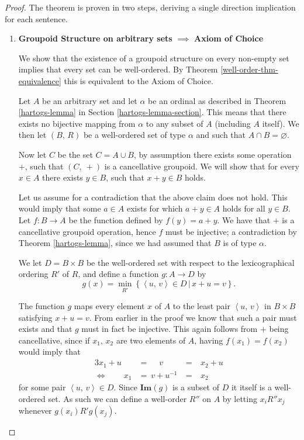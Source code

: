 \documentclass[../../main.tex]{subfiles}
\begin{document}
\begin{proof}
    The theorem is proven in two steps, deriving a single direction implication for each sentence.
    \begin{enumerate}
        \item \textbf{Groupoid Structure on arbitrary sets} $\implies$ \textbf{Axiom of Choice}
        
        We show that the existence of a groupoid structure on every non-empty set implies that every set can be well-ordered.
        By Theorem \ref{well-order-thm-equivalence} this is equivalent to the Axiom of Choice.

        Let $A$ be an arbitrary set and let $\alpha$ be an ordinal as described in Theorem \ref{hartogs-lemma} in Section \ref{hartogs-lemma-section}.
        This means that there exists no bijective mapping from $\alpha$ to any subset of $A$ (including $A$ itself).
        We then let $\left(B,\, R\right)$ be a well-ordered set of type $\alpha$ and such that $A \cap B = \varnothing$.
        
        Now let $C$ be the set $C = A \cup B$, by assumption there exists some operation $+$, such that $\left(C,\ +\right)$ is a cancellative groupoid. %
        We will show that for every $x \in A$ there exists $y \in B$, such that $x + y \in B$ holds.

        Let us assume for a contradiction that the above claim does not hold.
        This would imply that some $a \in A$ exists for which $a + y \in A$ holds for all $y \in B$.
        Let $f: B \to A$ be the function defined by $f(y) = a + y$.
        We have that $+$ is a cancellative groupoid operation, hence $f$ must be injective;
        a contradiction by Theorem \ref{hartogs-lemma}, since we had assumed that $B$ is of type $\alpha$.

        We let $D = B \times B$ be the well-ordered set with respect to the lexicographical ordering $R'$ of $R$,
        and define a function $g: A \to D$ by $$g(x) = \min_{R'} \left\{\left<u,\, v\right> \in D \,\vert\, x + u = v\right\}.$$
        
        The function $g$ maps every element $x$ of $A$ to the least pair $\left<u,\, v\right>$ in $B \times B$ satisfying $x + u = v$.
        From earlier in the proof we know that such a pair must exists and that $g$ must in fact be injective.
        This again follows from $+$ being cancellative, since if $x_1,\, x_2$ are two elements of $A$, having $f(x_1) = f(x_2)$ would imply that
        \begin{alignat*}{3}
                        x_1 + u  &= \quad \ v     &=& \ x_2 + u \\
            \iff \qquad x_1      &= \ v + u^{-1}\ &=& \ x_2     
        \end{alignat*} 
        for some pair $\left<u,\, v\right> \in D$.
        Since $\mathbf{Im}(g)$ is a subset of $D$ it itself is a well-ordered set.
        As such we can define a well-order $R''$ on $A$ by letting $x_i R'' x_j$ whenever $g(x_i) R' g(x_j)$.


\end{enumerate}
\end{proof}
\end{document}
